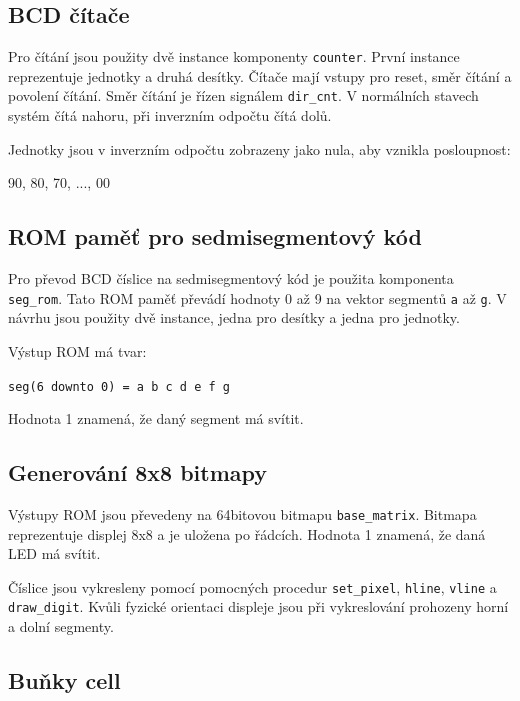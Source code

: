 \documentclass[11pt,a4paper]{article}
\begin{document}
\subsection{BCD čítače}

Pro čítání jsou použity dvě instance komponenty \texttt{counter}. První instance reprezentuje jednotky a druhá desítky. Čítače mají vstupy pro reset, směr čítání a povolení čítání. Směr čítání je řízen signálem \texttt{dir\_cnt}. V normálních stavech systém čítá nahoru, při inverzním odpočtu čítá dolů.

Jednotky jsou v inverzním odpočtu zobrazeny jako nula, aby vznikla posloupnost:

\begin{center}
90, 80, 70, ..., 00
\end{center}

\subsection{ROM paměť pro sedmisegmentový kód}

Pro převod BCD číslice na sedmisegmentový kód je použita komponenta \texttt{seg\_rom}. Tato ROM paměť převádí hodnoty 0 až 9 na vektor segmentů \texttt{a} až \texttt{g}. V návrhu jsou použity dvě instance, jedna pro desítky a jedna pro jednotky.

Výstup ROM má tvar:

\begin{center}
\texttt{seg(6 downto 0) = a b c d e f g}
\end{center}

Hodnota 1 znamená, že daný segment má svítit.

\subsection{Generování 8x8 bitmapy}

Výstupy ROM jsou převedeny na 64bitovou bitmapu \texttt{base\_matrix}. Bitmapa reprezentuje displej 8x8 a je uložena po řádcích. Hodnota 1 znamená, že daná LED má svítit.

Číslice jsou vykresleny pomocí pomocných procedur \texttt{set\_pixel}, \texttt{hline}, \texttt{vline} a \texttt{draw\_digit}. Kvůli fyzické orientaci displeje jsou při vykreslování prohozeny horní a dolní segmenty.

\subsection{Buňky cell}
\end{document}
